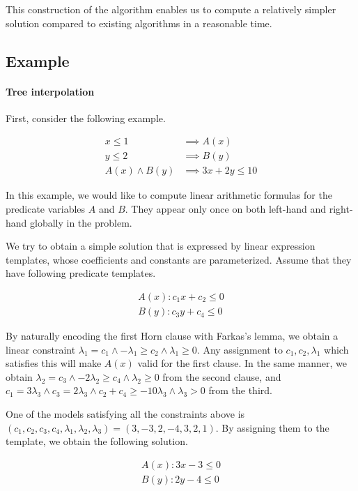 \documentclass[a4paper,12pt]{article}
\begin{document}
This construction of the algorithm enables us to compute a relatively
simpler solution compared to existing algorithms in a reasonable time.

\subsection{Example}

\paragraph {Tree interpolation}
First, consider the following example.

\begin{align*}
x \leq 1 & \implies A(x) \\
y \leq 2 & \implies B(y) \\
A(x) \wedge B(y) & \implies 3x+2y \leq 10
\end{align*}

In this example, we would like to compute linear arithmetic formulas
for the predicate variables $A$ and $B$.  They appear only once on
both left-hand and right-hand globally in the problem.

We try to obtain a simple solution that is expressed by linear
expression templates, whose coefficients and constants are
parameterized.  Assume that they have following predicate templates.

\begin{align*}
A(x) : c_1 x + c_2 \leq 0 \\
B(y) : c_3 y + c_4 \leq 0
\end{align*}

By naturally encoding the first Horn clause with Farkas's lemma, we
obtain a linear constraint
$ \lambda_1 = c_1 \wedge - \lambda_1 \geq c_2 \wedge \lambda_1 \geq 0 $.
Any assignment to $ c_1, c_2, \lambda_1 $ which satisfies this will
make $A(x)$ valid for the first clause.  In the same manner, we obtain
$ \lambda_2 = c_3 \wedge - 2 \lambda_2 \geq c_4 \wedge \lambda_2 \geq 0 $
from the second clause, and
$ c_1 = 3 \lambda_3 \wedge c_3 = 2 \lambda_3 \wedge c_2 + c_4 \geq -10 \lambda_3 \wedge \lambda_3 > 0 $
from the third.

One of the models satisfying all the constraints above is
$( c_1, c_2, c_3, c_4, \lambda_1, \lambda_2, \lambda_3 ) = (3, -3, 2, -4, 3, 2, 1)$.
By assigning them to the template, we obtain the following solution.

\begin{align*}
A(x) : 3 x - 3 \leq 0 \\
B(y) : 2 y - 4 \leq 0
\end{align*}
\end{document}
